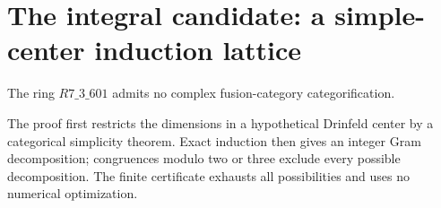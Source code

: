 \section{The integral candidate: a simple-center induction lattice}

\begin{theorem}\label{thm:r601-center-lattice}
The ring $R7\_3\_601$ admits no complex fusion-category
categorification.
\end{theorem}

The proof first restricts the dimensions in a hypothetical Drinfeld
center by a categorical simplicity theorem. Exact induction then gives
an integer Gram decomposition; congruences modulo two or three exclude
every possible decomposition. The finite certificate exhausts all
possibilities and uses no numerical optimization.

